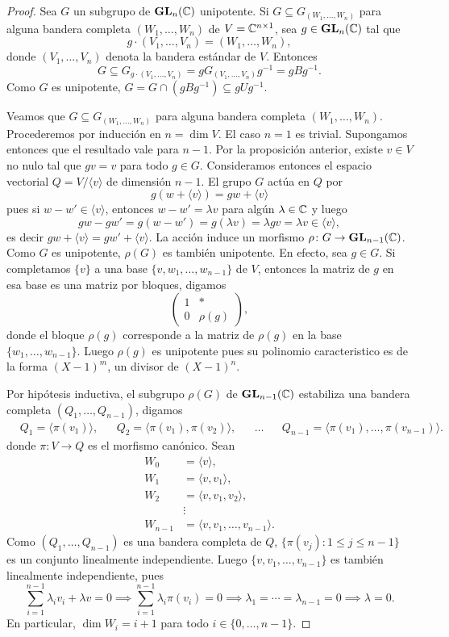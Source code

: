 \begin{proof}
	Sea $G$ un subgrupo de $\mathbf{GL}_n(\mathbb{C})$ unipotente. Si $G\subseteq G_{(W_1,\dots,W_n)}$ para alguna
	bandera completa $(W_1,\dots,W_n)$ de $V=\mathbb{C}^{n\times 1}$, sea $g\in\mathbf{GL}_n(\mathbb{C})$ tal que
	\[
	g\cdot (V_1,\dots,V_n)=(W_1,\dots,W_n),
	\]
	donde $(V_1,\dots,V_n)$ denota la bandera estándar de $V$. 
	Entonces  
	\[
	G\subseteq G_{g\cdot (V_1,\dots,V_n)}=gG_{(V_1,\dots,V_n)}g^{-1}=gBg^{-1}.
	\]
	Como $G$ es unipotente, $G=G\cap (gBg^{-1})\subseteq gUg^{-1}$. 

	Veamos que $G\subseteq G_{(W_1,\dots,W_n)}$ para alguna bandera completa $(W_1,\dots,W_n)$. 
	Procederemos por inducción en $n=\dim V$. El caso $n=1$ es trivial. Supongamos entonces
	que el resultado vale para $n-1$. 
	Por la proposición anterior, existe $v\in V$ no nulo 
	tal que $gv=v$ para todo $g\in G$. Consideramos entonces el espacio vectorial 
	$Q=V/\langle v\rangle$ de dimensión $n-1$. El grupo $G$ actúa en $Q$ 
	por 
	\[
	g(w+\langle v\rangle)=gw+\langle v\rangle
	\]
	pues si $w-w'\in\langle v\rangle$, entonces
	$w-w'=\lambda v$ para algún $\lambda\in\mathbb{C}$ y luego
	\[
	gw-gw'=g(w-w')=g(\lambda v)=\lambda gv=\lambda v\in\langle v\rangle,
	\]
	es decir $gw+\langle v\rangle=gw'+\langle v\rangle$. La acción induce un morfismo
	$\rho\colon G\to\mathbf{GL}_{n-1}(\mathbb{C})$. Como $G$ es unipotente, $\rho(G)$ es también unipotente. En efecto, sea $g\in G$. 
	Si completamos $\{v\}$ a una base 
	$\{v,w_1,\dots,w_{n-1}\}$ 
	de $V$, entonces la matriz de $g$ en esa base es una matriz por bloques, digamos 
	\[
	\left(\begin{array}{c|c}
	1 & *\\
	\hline
	0 & \rho(g)
	\end{array}
	\right),
	\]
	donde el bloque $\rho(g)$ corresponde 
	a la matriz de $\rho(g)$ en la base $\{w_1,\dots,w_{n-1}\}$. Luego $\rho(g)$ es unipotente pues 
    su polinomio caracteristico es de la forma $(X-1)^m$, un divisor de $(X-1)^n$. 
	
	Por hipótesis inductiva, el subgrupo 
	$\rho(G)$ de $\mathbf{GL}_{n-1}(\mathbb{C})$ estabiliza una bandera completa $(Q_1,\dots,Q_{n-1})$, digamos
	\begin{align*}
	&Q_1 =\langle \pi(v_1)\rangle,&&
	Q_2=\langle\pi(v_1),\pi(v_2)\rangle,&&
	\dots&&
	Q_{n-1}=\langle\pi(v_1),\dots,\pi(v_{n-1})\rangle.
	\end{align*}
	donde $\pi\colon V\to Q$ es el morfismo canónico. 
	Sean 
	\begin{align*}
	W_0&=\langle v\rangle,\\
	W_1&=\langle v,v_1\rangle,\\
	W_2&=\langle v,v_1,v_2\rangle,\\
	&\vdots\\
	W_{n-1}&=\langle v,v_1,\dots,v_{n-1}\rangle.
	\end{align*}	
	Como $(Q_1,\dots,Q_{n-1})$ es una bandera completa de $Q$,  
	$\{\pi(v_j):1\leq j\leq n-1\}$ es un conjunto linealmente independiente. Luego  
	$\{v,v_1,\dots,v_{n-1}\}$ es también linealmente independiente, pues
	\[
	\sum_{i=1}^{n-1}\lambda_i v_i+\lambda v=0\implies
	\sum_{i=1}^{n-1}\lambda _i\pi(v_i)=0
	\implies\lambda_1=\cdots=\lambda_{n-1}=0\implies \lambda=0.
	\]	
	En particular, $\dim W_i=i+1$ para todo $i\in\{0,\dots,n-1\}$. 
	

\end{proof}
